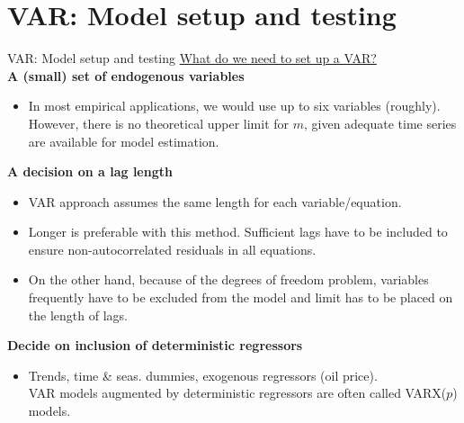 \documentclass[usenames,dvipsnames]{beamer}
\begin{document}
\section{VAR: Model setup and testing}
\begin{frame}{VAR: Model setup and testing}
\small
\underline{What do we need to set up a VAR?}\\
\vspace*{3mm}
\textbf{A (small) set of endogenous variables}
\vspace*{-1.5mm}
\begin{itemize}
\item In most empirical applications, we would use up to six variables (roughly). However, there is no theoretical upper limit for $m$, given adequate time series are available for model estimation.
\end{itemize}
\textbf{A decision on a lag length}
\vspace*{-1.3mm}
	\begin{itemize}
	\item VAR approach assumes the same length for each variable/equation.
	\vspace*{-0.7mm}
	\item Longer is preferable with this method. Sufficient lags have to be included to ensure non-autocorrelated residuals in all equations.
	\vspace*{-0.7mm}
	\item On the other hand, because of the degrees of freedom problem, variables frequently have to be excluded from the model and limit has to be placed on the length of lags.
	\end{itemize}
\textbf{Decide on inclusion of deterministic regressors}
\vspace*{-1.5mm}
\begin{itemize}
\item Trends, time \& seas. dummies, exogenous regressors (oil price). \\VAR models augmented by deterministic regressors are often called VARX($p$) models.
\end{itemize}
\end{frame}
\end{document}
